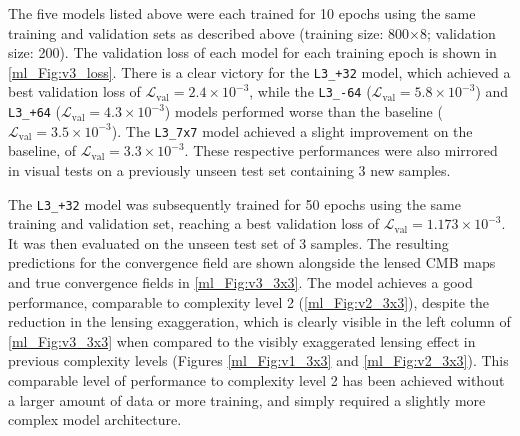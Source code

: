 
The five models listed above were each trained for 10 epochs using the same training and validation sets as described above (training size: 800$\times$8; validation size: 200). The validation loss of each model for each training epoch is shown in \autoref{ml_Fig:v3_loss}. There is a clear victory for the \texttt{L3\_+32} model, which achieved a best validation loss of $\mathcal{L}_\text{val} = 2.4 \times 10^{-3}$, while the \texttt{L3\_-64} ($\mathcal{L}_\text{val} = 5.8 \times 10^{-3}$) and \texttt{L3\_+64} ($\mathcal{L}_\text{val} = 4.3 \times 10^{-3}$) models performed worse than the baseline ($\mathcal{L}_\text{val} = 3.5 \times 10^{-3}$). The \texttt{L3\_7x7} model achieved a slight improvement on the baseline, of $\mathcal{L}_\text{val} = 3.3 \times 10^{-3}$. These respective performances were also mirrored in visual tests on a previously unseen test set containing 3 new samples.


The \texttt{L3\_+32} model was subsequently trained for 50 epochs using the same training and validation set, reaching a best validation loss of $\mathcal{L}_\text{val} = 1.173 \times 10^{-3}$. It was then evaluated on the unseen test set of 3 samples. The resulting predictions for the convergence field are shown alongside the lensed CMB maps and true convergence fields in \autoref{ml_Fig:v3_3x3}. The model achieves a good performance, comparable to complexity level 2 (\autoref{ml_Fig:v2_3x3}), despite the reduction in the lensing exaggeration, which is clearly visible in the left column of \autoref{ml_Fig:v3_3x3} when compared to the visibly exaggerated lensing effect in previous complexity levels (Figures \ref{ml_Fig:v1_3x3} and \ref{ml_Fig:v2_3x3}). This comparable level of performance to complexity level 2 has been achieved without a larger amount of data or more training, and simply required a slightly more complex model architecture.

